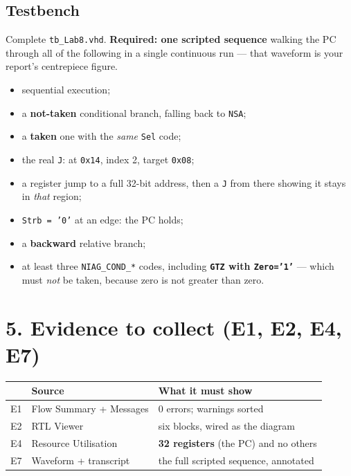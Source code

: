 \documentclass[11pt]{article}
\newcommand{\code}[1]{\texttt{#1}}
\begin{document}
\subsection*{Testbench}

Complete \code{tb\_Lab8.vhd}. \textbf{Required: one scripted sequence} walking
the PC through all of the following in a single continuous run --- that waveform
is your report's centrepiece figure.

\begin{itemize}[leftmargin=1.4em,itemsep=1pt]
\item sequential execution;
\item a \textbf{not-taken} conditional branch, falling back to \code{NSA};
\item a \textbf{taken} one with the \emph{same} \code{Sel} code;
\item the real \code{J}: at \code{0x14}, index 2, target \code{0x08};
\item a register jump to a full 32-bit address, then a \code{J} from there
showing it stays in \emph{that} region;
\item \code{Strb = '0'} at an edge: the PC holds;
\item a \textbf{backward} relative branch;
\item at least three \code{NIAG\_COND\_*} codes, including \textbf{\code{GTZ}
with \code{Zero='1'}} --- which must \emph{not} be taken, because zero is not
greater than zero.
\end{itemize}

\section*{5. Evidence to collect (E1, E2, E4, E7)}

\begin{center}
\begin{tabular}{lll}
\toprule
& Source & What it must show \\
\midrule
E1 & Flow Summary + Messages & 0 errors; warnings sorted \\
E2 & RTL Viewer & six blocks, wired as the diagram \\
E4 & Resource Utilisation & \textbf{32 registers} (the PC) and no others \\
E7 & Waveform + transcript & the full scripted sequence, annotated \\
\bottomrule
\end{tabular}
\end{center}
\end{document}
